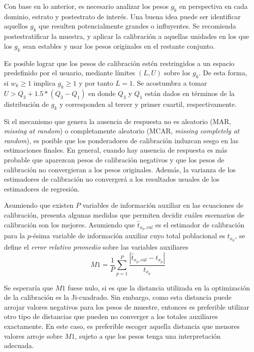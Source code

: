 \documentclass[
  12pt,
]{book}
\begin{document}
Con base en lo anterior, es necesario analizar los pesos \(g_k\) en perspectiva en cada dominio, estrato y postestrato de interés. Una buena idea puede ser identificar aquellos \(g_k\) que resulten potencialmente grandes o influyentes. Se recomienda postestratificar la muestra, y aplicar la calibración a aquellas unidades en los que los \(g_k\) sean estables y usar los pesos originales en el restante conjunto.

Es posible lograr que los pesos de calibración estén restringidos a un espacio predefinido por el usuario, mediante límites \((L, U)\) sobre los \(g_k\). De esta forma, si \(w_k \geq 1\) implica \(g_k \geq 1\) y por tanto \(L=1\). Se acostumbra a tomar \(U > Q_3 + 1.5 * (Q_3 - Q_1)\) en donde \(Q_3\) y \(Q_1\) están dados en términos de la distribución de \(g_k\) y corresponden al tercer y primer cuartil, respectivamente.

Si el mecanismo que genera la ausencia de respuesta no es aleatorio (MAR, \emph{missing at random}) o completamente aleatorio (MCAR, \emph{missing completely at random}), es posible que los ponderadores de calibración induzcan sesgo en las estimaciones finales. En general, cuando hay ausencia de respuesta es más probable que aparezcan pesos de calibración negativos y que los pesos de calibración no convergieran a los pesos originales. Además, la varianza de los estimadores de calibración no convergerá a los resultados usuales de los estimadores de regresión.

Asumiendo que existen \(P\) variables de información auxiliar en las ecuaciones de calibración, \citet{Silva_2004} presenta algunas medidas que permiten decidir cuáles escenarios de calibración son los mejores. Asumiendo que \(\hat{t}_{x_p, cal}\) es el estimador de calibración para la \(p\)-ésima variable de información auxiliar cuyo total poblacional es \(t_{x_p}\), se define el \emph{error relativo promedio} sobre las variables auxiliares
\[
M1= \frac{1}{P} \sum_{p=1}^P \frac{|\hat{t}_{x_p, cal} - t_{x_p}|}{t_{x_p}}
\]

Se esperaría que \(M1\) fuese nulo, si es que la distancia utilizada en la optimización de la calibración es la Ji-cuadrado. Sin embargo, como esta distancia puede arrojar valores negativos para los pesos de muestre, entonces es preferible utilizar otro tipo de distancias que pueden no converger a los totales auxiliares exactamente. En este caso, es preferible escoger aquella distancia que menores valores arroje sobre \(M1\), sujeto a que los pesos tenga una interpretación adecuada.
\end{document}
